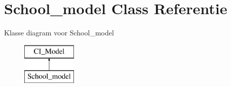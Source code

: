 \hypertarget{class_school__model}{}\section{School\+\_\+model Class Referentie}
\label{class_school__model}
Klasse diagram voor School\+\_\+model\begin{figure}[H]
\begin{center}
\leavevmode
\includegraphics[height=2.000000cm]{class_school__model}
\end{center}
\end{figure}
